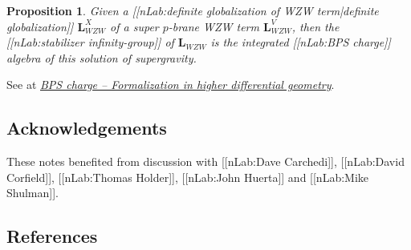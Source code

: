 \documentclass[12pt,titlepage]{article}
\theoremstyle{plain}
\newtheorem{prop}{Proposition}
\theoremstyle{definition}
\theoremstyle{remark}
\begin{document}
\begin{prop}
\label{}\hypertarget{}{}
Given a [[nLab:definite globalization of WZW term|definite globalization]] $\mathbf{L}_{WZW}^X$ of a super $p$-brane WZW term $\mathbf{L}_{WZW}^V$, then the [[nLab:stabilizer infinity-group]] of $\mathbf{L}_{WZW}$ is the integrated [[nLab:BPS charge]] algebra of this solution of supergravity.
\end{prop}
See at \emph{\href{http://ncatlab.org/nlab/show/BPS+state#InTermsOfHigherDifferentialGeometry}{BPS charge -- Formalization in higher differential geometry}}.
\hypertarget{acknowledgements}{}\subsection*{{Acknowledgements}}\label{acknowledgements}
These notes benefited from discussion with [[nLab:Dave Carchedi]], [[nLab:David Corfield]], [[nLab:Thomas Holder]], [[nLab:John Huerta]] and [[nLab:Mike Shulman]].
\hypertarget{references}{}\subsection*{{References}}\label{references}
\end{document}
